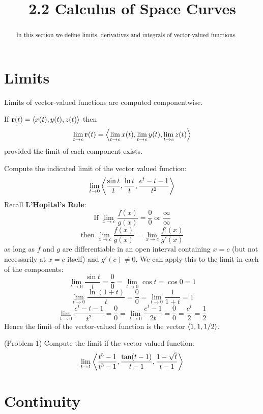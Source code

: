 \documentclass[handout]{ximera}
\title{2.2 Calculus of Space Curves}
\begin{document}
\begin{abstract}
In this section we define limits, derivatives and integrals of vector-valued functions.
\end{abstract}

\maketitle

\section{Limits}
Limits of vector-valued functions are computed componentwise. 
\begin{definition}
If $\mathbf r(t) = \left\langle x(t), y(t), z(t)\right\rangle$ then
\[
\lim_{t \to c} \mathbf r(t) = \left\langle \lim_{t \to c}x(t), \lim_{t \to c}y(t),\lim_{t \to c} z(t)\right\rangle
\]
provided the limit of each component exists.
\end{definition}

\begin{example}[Example 1]
Compute the indicated limit of the vector valued function:
\[
\lim_{t \to 0} \left\langle \frac{\sin t}{t}, \frac{\ln t}{t}, \frac{e^t - t -1}{t^2}\right\rangle
\]
Recall \textbf{L'Hopital's Rule}:
\[
\text{If}\; \lim_{x \to c} \frac{f(x)}{g(x)} = \frac00 \; \text{or} \; \frac{\infty}{\infty} 
\]
\[
\text{then} \; \lim_{x \to c} \frac{f(x)}{g(x)} = \lim_{x \to c} \frac{f'(x)}{g'(x)}
\]
as long as $f$ and $g$ are differentiable in an open interval containing $x = c$ (but not necessarily at $x = c$ itself)
and $g'(c) \neq 0$. We can apply this to the limit in each of the components:
\[
\lim_{t \to 0} \frac{\sin t}{t} = \frac00 = \lim_{t\to 0} \cos t = \cos 0  = 1
\]
\[
\lim_{t \to 0} \frac{\ln(1+t)}{t} = \frac00 = \lim_{t\to 0} \frac{1}{1+t} = 1
\]
\[
\lim_{t \to 0} \frac{e^t - t - 1}{t^2} = \frac00 = \lim_{t\to 0} \frac{e^t - 1}{2t} = \frac00 = \frac{e^t}{2}  = \frac12
\]
Hence the limit of the vector-valued function is the vector $\left\langle 1, 1, 1/2\right\rangle$.
\end{example}

\begin{problem}(Problem 1)
Compute the limit if the vector-valued function:
\[
\lim_{t \to 1} \left\langle \frac{t^5 - 1}{t^3 - 1}, \frac{\tan(t-1)}{t-1}, \frac{1 - \sqrt t}{t-1}\right\rangle
\]
\end{problem}

\section{Continuity}
\end{document}
